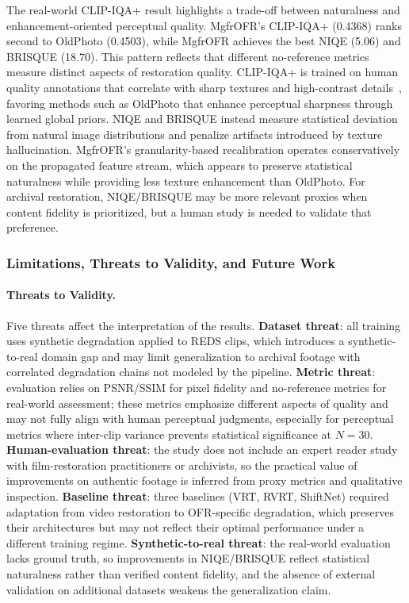 The real-world CLIP-IQA+ result highlights a trade-off between naturalness and enhancement-oriented perceptual quality. MgfrOFR's CLIP-IQA+ (0.4368) ranks second to OldPhoto (0.4503), while MgfrOFR achieves the best NIQE (5.06) and BRISQUE (18.70). This pattern reflects that different no-reference metrics measure distinct aspects of restoration quality. CLIP-IQA+ is trained on human quality annotations that correlate with sharp textures and high-contrast details~\cite{wang2023clipiqa}, favoring methods such as OldPhoto that enhance perceptual sharpness through learned global priors. NIQE and BRISQUE instead measure statistical deviation from natural image distributions and penalize artifacts introduced by texture hallucination. MgfrOFR's granularity-based recalibration operates conservatively on the propagated feature stream, which appears to preserve statistical naturalness while providing less texture enhancement than OldPhoto. For archival restoration, NIQE/BRISQUE may be more relevant proxies when content fidelity is prioritized, but a human study is needed to validate that preference.

\subsubsection{Limitations, Threats to Validity, and Future Work}
\label{subsec:limitations}

\paragraph{Threats to Validity.}
Five threats affect the interpretation of the results. \textbf{Dataset threat}: all training uses synthetic degradation applied to REDS clips, which introduces a synthetic-to-real domain gap and may limit generalization to archival footage with correlated degradation chains not modeled by the pipeline. \textbf{Metric threat}: evaluation relies on PSNR/SSIM for pixel fidelity and no-reference metrics for real-world assessment; these metrics emphasize different aspects of quality and may not fully align with human perceptual judgments, especially for perceptual metrics where inter-clip variance prevents statistical significance at $N{=}30$. \textbf{Human-evaluation threat}: the study does not include an expert reader study with film-restoration practitioners or archivists, so the practical value of improvements on authentic footage is inferred from proxy metrics and qualitative inspection. \textbf{Baseline threat}: three baselines (VRT, RVRT, ShiftNet) required adaptation from video restoration to OFR-specific degradation, which preserves their architectures but may not reflect their optimal performance under a different training regime. \textbf{Synthetic-to-real threat}: the real-world evaluation lacks ground truth, so improvements in NIQE/BRISQUE reflect statistical naturalness rather than verified content fidelity, and the absence of external validation on additional datasets weakens the generalization claim.

